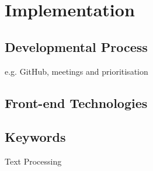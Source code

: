 \chapter{Implementation}

\section{Developmental Process}

e.g. GitHub, meetings and prioritisation

\section{Front-end Technologies}

\section{Keywords}

Text Processing



